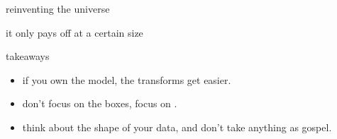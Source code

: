   \begin{frame}{reinventing the universe}
  \end{frame}

  \begin{frame}{it only pays off at a certain size}
  \end{frame}

  \begin{frame}{takeaways}
    \begin{itemize}
			\item if you own the model, the transforms get easier.
      \item don’t focus on the boxes, focus on .
			\item think about the shape of your data, and don’t take anything as
				gospel.
		\end{itemize}
  \end{frame}
